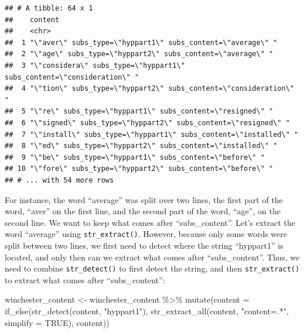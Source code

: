 \documentclass[
]{article}
\newenvironment{Shaded}{\begin{snugshade}}{\end{snugshade}}
\newcommand{\AttributeTok}[1]{\textcolor[rgb]{0.77,0.63,0.00}{#1}}
\newcommand{\ConstantTok}[1]{\textcolor[rgb]{0.00,0.00,0.00}{#1}}
\newcommand{\FunctionTok}[1]{\textcolor[rgb]{0.00,0.00,0.00}{#1}}
\newcommand{\NormalTok}[1]{#1}
\newcommand{\OtherTok}[1]{\textcolor[rgb]{0.56,0.35,0.01}{#1}}
\newcommand{\SpecialCharTok}[1]{\textcolor[rgb]{0.00,0.00,0.00}{#1}}
\newcommand{\StringTok}[1]{\textcolor[rgb]{0.31,0.60,0.02}{#1}}
\begin{document}
\begin{verbatim}
## # A tibble: 64 x 1
##    content                                                               
##    <chr>                                                                 
##  1 "\"aver\" subs_type=\"hyppart1\" subs_content=\"average\" "           
##  2 "\"age\" subs_type=\"hyppart2\" subs_content=\"average\" "            
##  3 "\"considera\" subs_type=\"hyppart1\" subs_content=\"consideration\" "
##  4 "\"tion\" subs_type=\"hyppart2\" subs_content=\"consideration\" "     
##  5 "\"re\" subs_type=\"hyppart1\" subs_content=\"resigned\" "            
##  6 "\"signed\" subs_type=\"hyppart2\" subs_content=\"resigned\" "        
##  7 "\"install\" subs_type=\"hyppart1\" subs_content=\"installed\" "      
##  8 "\"ed\" subs_type=\"hyppart2\" subs_content=\"installed\" "           
##  9 "\"be\" subs_type=\"hyppart1\" subs_content=\"before\" "              
## 10 "\"fore\" subs_type=\"hyppart2\" subs_content=\"before\" "            
## # ... with 54 more rows
\end{verbatim}

For instance, the word ``average'' was split over two lines, the first part of the word, ``aver'' on the
first line, and the second part of the word, ``age'', on the second line. We want to keep what comes
after ``subs\_content''. Let's extract the word ``average'' using \texttt{str\_extract()}. However, because only
some words were split between two lines, we first need to detect where the string ``hyppart1'' is
located, and only then can we extract what comes after ``subs\_content''. Thus, we need to combine
\texttt{str\_detect()} to first detect the string, and then \texttt{str\_extract()} to extract what comes after
``subs\_content'':

\begin{Shaded}
\begin{Highlighting}[]
\NormalTok{winchester\_content }\OtherTok{\textless{}{-}}\NormalTok{ winchester\_content }\SpecialCharTok{\%\textgreater{}\%} 
  \FunctionTok{mutate}\NormalTok{(}\AttributeTok{content =} \FunctionTok{if\_else}\NormalTok{(}\FunctionTok{str\_detect}\NormalTok{(content, }\StringTok{"hyppart1"}\NormalTok{), }
                           \FunctionTok{str\_extract\_all}\NormalTok{(content, }\StringTok{"content=.*"}\NormalTok{, }\AttributeTok{simplify =} \ConstantTok{TRUE}\NormalTok{), }
\NormalTok{                           content))}
\end{Highlighting}
\end{Shaded}
\end{document}
